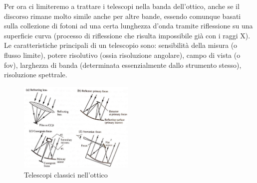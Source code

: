 \documentclass[a4paper,twoside,openany,notitlepage]{book}
\theoremstyle{definition}
\theoremstyle{plain}
\begin{document}
Per ora ci limiteremo a trattare i telescopi nella banda dell'ottico, anche se il discorso rimane molto simile anche per altre bande, essendo comunque basati sulla collezione di fotoni ad una certa lunghezza d'onda tramite riflessione su una superficie curva (processo di riflessione che risulta impossibile già con i raggi X). Le caratteristiche principali di un telescopio sono: sensibilità della misura (o flusso limite), potere risolutivo (ossia risoluzione angolare), campo di vista (o fov), larghezza di banda (determinata essenzialmente dallo strumento stesso), risoluzione spettrale.

\begin{figure}
	\vspace{-10pt}
	\centering
	\includegraphics[width=0.49\textwidth]{./Immagini/Capitolo2/Telescopi_classici.png}
	\caption*{Telescopi classici nell'ottico}
	\vspace{-10pt}
\end{figure}
\end{document}
